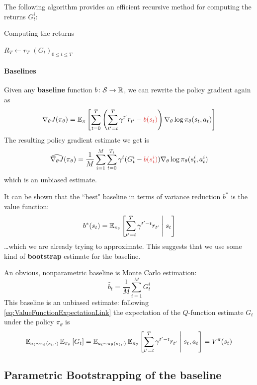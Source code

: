 \documentclass[../course-notes.tex]{subfiles}
\begin{document}
The following algorithm provides an efficient recursive method for computing the returns $G^i_t$:

\begin{algorithm}
	\caption{Computing the returns}\label{algo:ComputeReturnsEfficient}
	$R_T \leftarrow r_T$\;
	\Return $(G_t)_{0\leq t\leq T}$\;
\end{algorithm}


\paragraph{Baselines} Given any \textbf{\bluefont baseline} function $b\colon \mathcal{S} \to \mathbb{R}$, we can rewrite the policy gradient again as
\begin{equation}\label{eq:PolicyGradBaseline}
\nabla_\theta J(\pi_\theta) =
\EE_\pi \left[
\sum_{t=0}^T
\left(
\sum_{t'=t}^T \gamma^{t'} r_{t'} - {\redfont b(s_t)}
\right)
\nabla_\theta \log\pi_\theta(s_t, a_t)
\right]
\end{equation}
The resulting policy gradient estimate we get is
\begin{equation}\label{eq:MCPolicyGradBaseline}
\widehat{\nabla_\theta J}(\pi_\theta) =
\frac{1}{M}\sum_{i=1}^M
\sum_{t=0}^{T_i}
\gamma^t (G^i_t - {\redfont b(s^i_t)})
\nabla_\theta \log\pi_\theta (s_t^i, a_t^i)
\end{equation}
which is an unbiased estimate.

It can be shown that the ``best" baseline in terms of variance reduction $b^*$ is the value function:
\[
b^*(s_t) = \operatorname{\mathbb{E}}_{\pi_\theta}\left[\sum_{t'=t}^T \gamma^{t'-t} r_{t'} \;\middle|\; s_t \right]
\]
\ldots which we are already trying to approximate. This suggests that we use some kind of \textbf{bootstrap} estimate for the baseline.

An obvious, nonparametric baseline is Monte Carlo estimation:
\[
\widehat{b}_t =
\frac{1}{M}\sum_{i=1}^M G^i_t
\]
This baseline is an unbiased estimate: following \cref{eq:ValueFunctionExpectationLink} the expectation of the $Q$-function estimate $G_t$ under the policy $\pi_\theta$ is
\[
\operatorname{\mathbb{E}}_{a_t\sim \pi_\theta(s_t,\cdot)}
\operatorname{\mathbb{E}}_{\pi_\theta}
\left[G_t\right] =
\operatorname{\mathbb{E}}_{a_t\sim\pi_\theta(s_t,\cdot)}
\operatorname{\mathbb{E}}_{\pi_\theta}
\left[
\sum_{t'=t}^T \gamma^{t'-t}r_{t'}
\;\middle|\; s_t,a_t
\right] = V^\pi(s_t)
\]


\subsection{Parametric Bootstrapping of the baseline}\label{sec:REINFORCEparametricBaseline}
\end{document}
